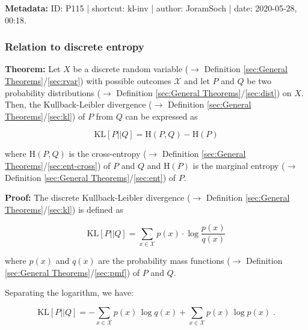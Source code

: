 \documentclass[a4paper,12pt,twoside]{book}
\begin{document}
\vspace{1em}
\textbf{Metadata:} ID: P115 | shortcut: kl-inv | author: JoramSoch | date: 2020-05-28, 00:18.
\vspace{1em}



\subsubsection[\textbf{Relation to discrete entropy}]{Relation to discrete entropy} \label{sec:kl-ent}
\setcounter{equation}{0}

\textbf{Theorem:} Let $X$ be a discrete random variable ($\rightarrow$ Definition \ref{sec:General Theorems}/\ref{sec:rvar}) with possible outcomes $\mathcal{X}$ and let $P$ and $Q$ be two probability distributions ($\rightarrow$ Definition \ref{sec:General Theorems}/\ref{sec:dist}) on $X$. Then, the Kullback-Leibler divergence ($\rightarrow$ Definition \ref{sec:General Theorems}/\ref{sec:kl}) of $P$ from $Q$ can be expressed as

\begin{equation} \label{eq:kl-ent-kl-ent}
\mathrm{KL}[P||Q] = \mathrm{H}(P,Q) - \mathrm{H}(P)
\end{equation}

where $\mathrm{H}(P,Q)$ is the cross-entropy ($\rightarrow$ Definition \ref{sec:General Theorems}/\ref{sec:ent-cross}) of $P$ and $Q$ and $\mathrm{H}(P)$ is the marginal entropy ($\rightarrow$ Definition \ref{sec:General Theorems}/\ref{sec:ent}) of $P$.


\vspace{1em}
\textbf{Proof:} The discrete Kullback-Leibler divergence ($\rightarrow$ Definition \ref{sec:General Theorems}/\ref{sec:kl}) is defined as

\begin{equation} \label{eq:kl-ent-KL}
\mathrm{KL}[P||Q] = \sum_{x \in \mathcal{X}} p(x) \cdot \log \frac{p(x)}{q(x)}
\end{equation}

where $p(x)$ and $q(x)$ are the probability mass functions ($\rightarrow$ Definition \ref{sec:General Theorems}/\ref{sec:pmf}) of $P$ and $Q$.

Separating the logarithm, we have:

\begin{equation} \label{eq:kl-ent-KL-dev}
\mathrm{KL}[P||Q] = - \sum_{x \in \mathcal{X}} p(x) \, \log q(x) + \sum_{x \in \mathcal{X}} p(x) \, \log p(x) \; .
\end{equation}
\end{document}
